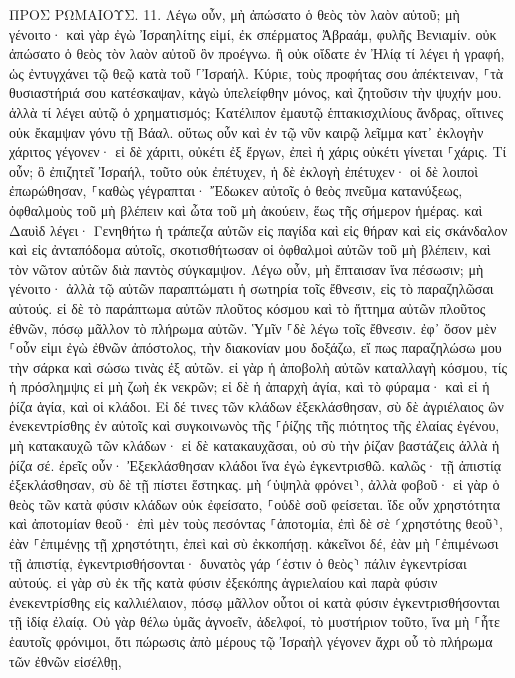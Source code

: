\documentclass[twoside, 9pt]{extreport}
\begin{document}
ΠΡΟΣ ΡΩΜΑΙΟΥΣ.
11.
Λέγω οὖν, μὴ ἀπώσατο ὁ θεὸς τὸν λαὸν αὐτοῦ; μὴ γένοιτο· καὶ γὰρ ἐγὼ Ἰσραηλίτης εἰμί, ἐκ σπέρματος Ἀβραάμ, φυλῆς Βενιαμίν. 
οὐκ ἀπώσατο ὁ θεὸς τὸν λαὸν αὐτοῦ ὃν προέγνω. ἢ οὐκ οἴδατε ἐν Ἠλίᾳ τί λέγει ἡ γραφή, ὡς ἐντυγχάνει τῷ θεῷ κατὰ τοῦ ⸀Ἰσραήλ. 
Κύριε, τοὺς προφήτας σου ἀπέκτειναν, ⸀τὰ θυσιαστήριά σου κατέσκαψαν, κἀγὼ ὑπελείφθην μόνος, καὶ ζητοῦσιν τὴν ψυχήν μου. 
ἀλλὰ τί λέγει αὐτῷ ὁ χρηματισμός; Κατέλιπον ἐμαυτῷ ἑπτακισχιλίους ἄνδρας, οἵτινες οὐκ ἔκαμψαν γόνυ τῇ Βάαλ. 
οὕτως οὖν καὶ ἐν τῷ νῦν καιρῷ λεῖμμα κατ᾽ ἐκλογὴν χάριτος γέγονεν· 
εἰ δὲ χάριτι, οὐκέτι ἐξ ἔργων, ἐπεὶ ἡ χάρις οὐκέτι γίνεται ⸀χάρις. 
Τί οὖν; ὃ ἐπιζητεῖ Ἰσραήλ, τοῦτο οὐκ ἐπέτυχεν, ἡ δὲ ἐκλογὴ ἐπέτυχεν· οἱ δὲ λοιποὶ ἐπωρώθησαν, 
⸀καθὼς γέγραπται· Ἔδωκεν αὐτοῖς ὁ θεὸς πνεῦμα κατανύξεως, ὀφθαλμοὺς τοῦ μὴ βλέπειν καὶ ὦτα τοῦ μὴ ἀκούειν, ἕως τῆς σήμερον ἡμέρας. 
καὶ Δαυὶδ λέγει· Γενηθήτω ἡ τράπεζα αὐτῶν εἰς παγίδα καὶ εἰς θήραν καὶ εἰς σκάνδαλον καὶ εἰς ἀνταπόδομα αὐτοῖς, 
σκοτισθήτωσαν οἱ ὀφθαλμοὶ αὐτῶν τοῦ μὴ βλέπειν, καὶ τὸν νῶτον αὐτῶν διὰ παντὸς σύγκαμψον. 
Λέγω οὖν, μὴ ἔπταισαν ἵνα πέσωσιν; μὴ γένοιτο· ἀλλὰ τῷ αὐτῶν παραπτώματι ἡ σωτηρία τοῖς ἔθνεσιν, εἰς τὸ παραζηλῶσαι αὐτούς. 
εἰ δὲ τὸ παράπτωμα αὐτῶν πλοῦτος κόσμου καὶ τὸ ἥττημα αὐτῶν πλοῦτος ἐθνῶν, πόσῳ μᾶλλον τὸ πλήρωμα αὐτῶν. 
Ὑμῖν ⸀δὲ λέγω τοῖς ἔθνεσιν. ἐφ᾽ ὅσον μὲν ⸀οὖν εἰμι ἐγὼ ἐθνῶν ἀπόστολος, τὴν διακονίαν μου δοξάζω, 
εἴ πως παραζηλώσω μου τὴν σάρκα καὶ σώσω τινὰς ἐξ αὐτῶν. 
εἰ γὰρ ἡ ἀποβολὴ αὐτῶν καταλλαγὴ κόσμου, τίς ἡ πρόσλημψις εἰ μὴ ζωὴ ἐκ νεκρῶν; 
εἰ δὲ ἡ ἀπαρχὴ ἁγία, καὶ τὸ φύραμα· καὶ εἰ ἡ ῥίζα ἁγία, καὶ οἱ κλάδοι. 
Εἰ δέ τινες τῶν κλάδων ἐξεκλάσθησαν, σὺ δὲ ἀγριέλαιος ὢν ἐνεκεντρίσθης ἐν αὐτοῖς καὶ συγκοινωνὸς τῆς ⸀ῥίζης τῆς πιότητος τῆς ἐλαίας ἐγένου, 
μὴ κατακαυχῶ τῶν κλάδων· εἰ δὲ κατακαυχᾶσαι, οὐ σὺ τὴν ῥίζαν βαστάζεις ἀλλὰ ἡ ῥίζα σέ. 
ἐρεῖς οὖν· Ἐξεκλάσθησαν κλάδοι ἵνα ἐγὼ ἐγκεντρισθῶ. 
καλῶς· τῇ ἀπιστίᾳ ἐξεκλάσθησαν, σὺ δὲ τῇ πίστει ἕστηκας. μὴ ⸂ὑψηλὰ φρόνει⸃, ἀλλὰ φοβοῦ· 
εἰ γὰρ ὁ θεὸς τῶν κατὰ φύσιν κλάδων οὐκ ἐφείσατο, ⸀οὐδὲ σοῦ φείσεται. 
ἴδε οὖν χρηστότητα καὶ ἀποτομίαν θεοῦ· ἐπὶ μὲν τοὺς πεσόντας ⸀ἀποτομία, ἐπὶ δὲ σὲ ⸂χρηστότης θεοῦ⸃, ἐὰν ⸀ἐπιμένῃς τῇ χρηστότητι, ἐπεὶ καὶ σὺ ἐκκοπήσῃ. 
κἀκεῖνοι δέ, ἐὰν μὴ ⸀ἐπιμένωσι τῇ ἀπιστίᾳ, ἐγκεντρισθήσονται· δυνατὸς γάρ ⸂ἐστιν ὁ θεὸς⸃ πάλιν ἐγκεντρίσαι αὐτούς. 
εἰ γὰρ σὺ ἐκ τῆς κατὰ φύσιν ἐξεκόπης ἀγριελαίου καὶ παρὰ φύσιν ἐνεκεντρίσθης εἰς καλλιέλαιον, πόσῳ μᾶλλον οὗτοι οἱ κατὰ φύσιν ἐγκεντρισθήσονται τῇ ἰδίᾳ ἐλαίᾳ. 
Οὐ γὰρ θέλω ὑμᾶς ἀγνοεῖν, ἀδελφοί, τὸ μυστήριον τοῦτο, ἵνα μὴ ⸀ἦτε ἑαυτοῖς φρόνιμοι, ὅτι πώρωσις ἀπὸ μέρους τῷ Ἰσραὴλ γέγονεν ἄχρι οὗ τὸ πλήρωμα τῶν ἐθνῶν εἰσέλθῃ, 
\end{document}
